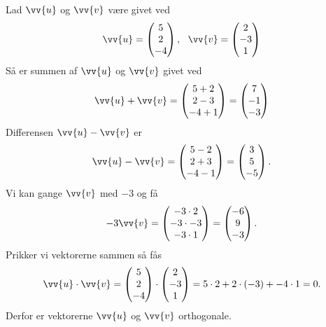 \begin{exa}
	Lad $\vv{u}$ og $\vv{v}$ være givet ved
		\begin{align*}
				\vv{u} =
				\begin{pmatrix}
					5 \\ 2 \\ -4
				\end{pmatrix}, \  \  \vv{v} = 
				\begin{pmatrix}
					2 \\ -3 \\ 1
				\end{pmatrix}
		\end{align*}
		Så er summen af $\vv{u}$ og $\vv{v}$ givet ved
		\begin{align*}
			\vv{u} + \vv{v} = 
			\begin{pmatrix}
				5+2 \\
				2-3 \\
				-4+1
			\end{pmatrix} = 
			\begin{pmatrix}
				7\\ -1 \\ -3
			\end{pmatrix}
		\end{align*}
		Differensen $\vv{u}-\vv{v}$ er
		\begin{align*}
			\vv{u} - \vv{v} =
			\begin{pmatrix}
				5-2\\
				2+3\\
				-4-1
			\end{pmatrix}=
			\begin{pmatrix}
				3 \\ 5 \\ -5
			\end{pmatrix}.
		\end{align*}
		Vi kan gange $\vv{v}$ med $-3$ og få
		\begin{align*}
			-3\vv{v}=
			\begin{pmatrix}
				-3\cdot 2\\
				-3 \cdot -3\\
				-3 \cdot 1
			\end{pmatrix} =
			\begin{pmatrix}
				-6 \\ 9 \\ -3
			\end{pmatrix}.
		\end{align*}
		Prikker vi vektorerne sammen så fås
		\begin{align*}
			\vv{u} \cdot \vv{v} = 
			\begin{pmatrix}
				5 \\ 2 \\ -4
			\end{pmatrix} \cdot
			\begin{pmatrix}
				2 \\ -3 \\ 1
			\end{pmatrix} =
			5\cdot 2 + 2\cdot(-3) + -4\cdot 1 = 0.
		\end{align*}
		Derfor er vektorerne $\vv{u}$ og $\vv{v}$ orthogonale.
\end{exa}
